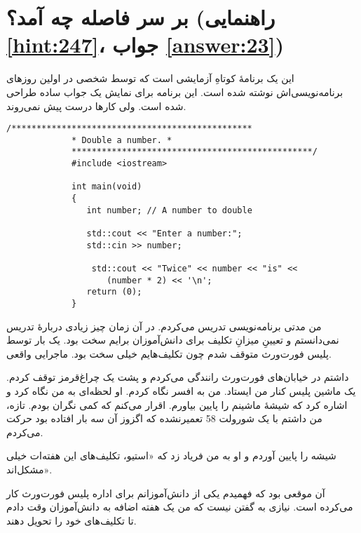 \section[بر سر فاصله چه آمد؟]{بر سر فاصله چه آمد؟ \protect{} (راهنمایی \ref{hint:247}، جواب \ref{answer:23})}
این یک برنامهٔ کوتاهِ آزمایشی است که توسط شخصی در اولین روزهای برنامه‌نویسی‌اش نوشته شده است. این برنامه برای نمایش یک جواب ساده طراحی شده است. ولی کارها درست پیش نمی‌روند.

\begin{LTR}
        \begin{lstlisting}[style=C++Style]
             /************************************************
             * Double a number. *
             ************************************************/
             #include <iostream>

             int main(void)
             {
             	int number; // A number to double

             	std::cout << "Enter a number:";
             	std::cin >> number;

            	 std::cout << "Twice" << number << "is" <<
             		(number * 2) << '\n';
             	return (0);
             }
        \end{lstlisting}
\end{LTR}

\begin{tcolorbox}
    من مدتی برنامه‌نویسی تدریس می‌کردم. در آن زمان چیز زیادی دربارهٔ تدریس نمی‌دانستم و تعیینِ میزانِ تکلیف برای دانش‌آموزان برایم سخت بود. یک بار توسط پلیس فورت‌ورث متوقف شدم چون تکلیف‌هایم خیلی سخت بود. ماجرایی واقعی.

    داشتم در خیابان‌های فورت‌ورث رانندگی می‌کردم و پشت یک چراغ‌قرمز توقف کردم. یک ماشین پلیس کنار من ایستاد. من به افسر نگاه کردم. او لحظه‌ای به من نگاه کرد و اشاره کرد که شیشهٔ ماشینم را پایین بیاورم. اقرار می‌کنم که کمی نگران بودم. تازه، من داشتم با یک شورولت 58 تعمیرنشده که اگزوز آن سه بار افتاده بود حرکت می‌کردم.

    شیشه را پایین آوردم و او به من فریاد زد که «استیو، تکلیف‌های این هفته‌ات خیلی مشکل‌اند».

    آن موقعی بود که فهمیدم یکی از دانش‌آموزانم برای اداره پلیس فورت‌ورث کار می‌کرده است. نیازی به گفتن نیست که من یک هفته اضافه به دانش‌آموزان وقت دادم تا تکلیف‌های خود را تحویل دهند.
\end{tcolorbox}